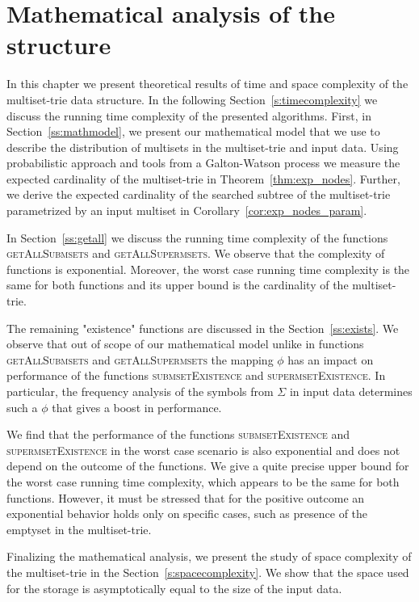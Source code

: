 \section{Mathematical analysis of the structure} \label{c:analysis}
%
In this chapter we present theoretical results of time and space complexity of
the multiset-trie data structure. In the following Section~\ref{s:timecomplexity} 
we discuss the running time complexity of the presented algorithms. First, in 
Section~\ref{ss:mathmodel}, we present our mathematical model that we use 
to describe the distribution of multisets in the multiset-trie and input data. 
Using probabilistic approach and tools from a Galton-Watson process we 
measure the expected cardinality of the multiset-trie in Theorem~\ref{thm:exp_nodes}. 
Further, we derive the expected cardinality of the searched subtree of the 
multiset-trie parametrized by an input multiset in Corollary~\ref{cor:exp_nodes_param}.

In Section~\ref{ss:getall} we discuss the running time complexity of the functions 
\textsc{getAllSubmsets} and \textsc{getAllSupermsets}. We observe that the 
complexity of functions is exponential. Moreover, the worst case running time 
complexity is the same for both functions and its upper bound is the cardinality of 
the multiset-trie.

The remaining "existence" functions are discussed in the Section~\ref{ss:exists}. 
We observe that out of scope of our mathematical model unlike in functions 
\textsc{getAllSubmsets} and \textsc{getAllSupermsets} the mapping $\phi$ has an 
impact on performance of the functions \textsc{submsetExistence} and 
\textsc{supermsetExistence}. In particular, the frequency analysis of the symbols 
from $\Sigma$ in input data determines such a $\phi$ that gives a boost in performance. 

We find that the performance of the functions \textsc{submsetExistence} and 
\textsc{supermsetExistence} in the worst case scenario is also exponential and 
does not depend on the outcome of the functions. We give a quite precise upper 
bound for the worst case running time complexity, which appears to be the same 
for both functions. However, it must be stressed that for the positive outcome an 
exponential behavior holds only on specific cases, such as presence of the emptyset 
in the multiset-trie. 

Finalizing the mathematical analysis, we present the study of space complexity 
of the multiset-trie in the Section~\ref{s:spacecomplexity}. We show that the space 
used for the storage is asymptotically equal to the size of the input data. 

